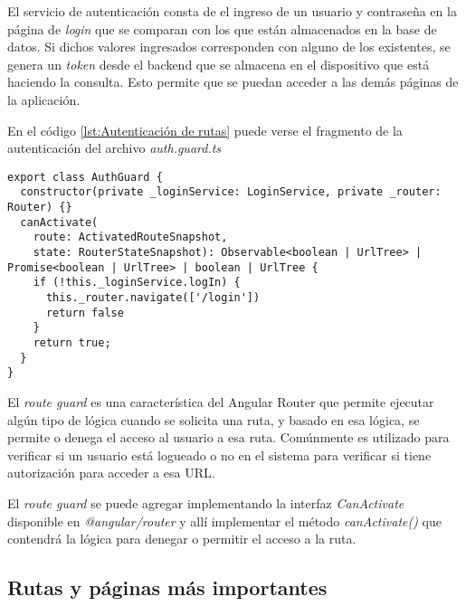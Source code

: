 El servicio de autenticación consta de el ingreso de un usuario y contraseña en la página de \textit{login} que se comparan con los que están almacenados en la base de datos. Si dichos valores ingresados corresponden con alguno de los existentes, se genera un \textit{token} desde el backend que se almacena en el dispositivo que está haciendo la consulta. Esto permite que se puedan acceder a las demás páginas de la aplicación.

En el código \ref{lst:Autenticación de rutas} puede verse el fragmento de la autenticación del archivo \textit{auth.guard.ts}



\begin{lstlisting}[caption={Autenticación de rutas}, label={lst:Autenticación de rutas}]
export class AuthGuard {
  constructor(private _loginService: LoginService, private _router: Router) {}
  canActivate(
    route: ActivatedRouteSnapshot,
    state: RouterStateSnapshot): Observable<boolean | UrlTree> | Promise<boolean | UrlTree> | boolean | UrlTree {
    if (!this._loginService.logIn) {
      this._router.navigate(['/login'])
      return false
    }
    return true;
  }
}
\end{lstlisting}

El \textit{route guard} es una característica del Angular Router que permite ejecutar algún tipo de lógica cuando se solicita una ruta, y basado en esa lógica, se permite o denega el acceso al usuario a esa ruta. Comúnmente es utilizado para verificar si un usuario está logueado o no en el sistema para verificar si tiene autorización para acceder a esa URL.

El \textit{route guard} se puede agregar implementando la interfaz \textit{CanActivate} disponible en \textit{@angular/router} y allí implementar el método \textit{canActivate()} que contendrá la lógica para denegar o permitir el acceso a la ruta.\citep{22}

\subsection{Rutas y páginas más importantes}

